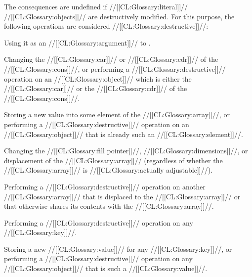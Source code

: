 



The consequences are undefined if //[[CL:Glossary:literal]]// //[[CL:Glossary:objects]]// 
are destructively modified.  For this purpose, the following operations 
are considered //[[CL:Glossary:destructive]]//:

\beginlist




Using it as an //[[CL:Glossary:argument]]// to .




Changing the //[[CL:Glossary:car]]// or //[[CL:Glossary:cdr]]// of the //[[CL:Glossary:cons]]//,
or performing a //[[CL:Glossary:destructive]]// operation on an //[[CL:Glossary:object]]// which is either
the //[[CL:Glossary:car]]// or the //[[CL:Glossary:cdr]]// of the //[[CL:Glossary:cons]]//.








Storing a new value into some element of the //[[CL:Glossary:array]]//,
or performing a //[[CL:Glossary:destructive]]// operation 
on an //[[CL:Glossary:object]]// that is already such an //[[CL:Glossary:element]]//.

Changing the //[[CL:Glossary:fill pointer]]//, //[[CL:Glossary:dimensions]]//, or displacement of
the //[[CL:Glossary:array]]// (regardless of whether the //[[CL:Glossary:array]]// is //[[CL:Glossary:actually adjustable]]//).

Performing a //[[CL:Glossary:destructive]]// operation on another //[[CL:Glossary:array]]// 
that is displaced to the //[[CL:Glossary:array]]// or that otherwise shares its contents
with the //[[CL:Glossary:array]]//.





Performing a //[[CL:Glossary:destructive]]// operation on any //[[CL:Glossary:key]]//.

Storing a new //[[CL:Glossary:value]]// for any //[[CL:Glossary:key]]//,
or performing a //[[CL:Glossary:destructive]]// operation 
on any //[[CL:Glossary:object]]// that is such a //[[CL:Glossary:value]]//.

